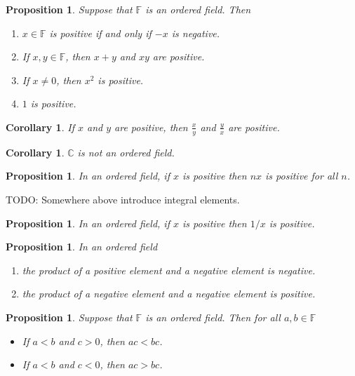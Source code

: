 \documentclass[11pt]{article}
\newtheorem{proposition}[theorem]{Proposition}
\newtheorem{corollary}[theorem]{Corollary}
\theoremstyle{definition}
\begin{document}
\begin{proposition}
  Suppose that $\mathbb{F}$ is an ordered field. Then
  \begin{enumerate}
    \item $x\in \mathbb{F}$ is positive if and only if $-x$ is negative.
    \item If $x,y \in \mathbb{F}$, then $x+y$ and $xy$ are positive.
    \item If $x\neq 0$, then $x^2$ is positive.
    \item $1$ is positive.
  \end{enumerate}
\end{proposition}

\begin{corollary}
  If $x$ and $y$ are positive, then $\frac{x}{y}$ and $\frac{y}{x}$ are positive.
\end{corollary}

\begin{corollary}
  $\mathbb{C}$ is not an ordered field.
\end{corollary}

\begin{proposition}
  In an ordered field, if $x$ is positive then $nx$ is positive for all $n$.
\end{proposition}

TODO: Somewhere above introduce integral elements.

\begin{proposition}
  In an ordered field, if $x$ is positive then $1/x$ is positive.
\end{proposition}

\begin{proposition} In an ordered field
  \begin{enumerate}
    \item[(a)] the product of a positive element and a negative element is negative.
    \item[(b)] the product of a negative element and a negative element is positive.
  \end{enumerate}
\end{proposition}


\begin{proposition}
  Suppose that $\mathbb{F}$ is an ordered field. Then for all $a,b\in\mathbb{F}$
  \begin{itemize}
    \item[(a)] If $a<b$ and $c>0$, then $ac < bc$.
    \item[(b)] If $a< b$ and $c < 0$, then $ac > bc$.
  \end{itemize}
\end{proposition}
\end{document}
